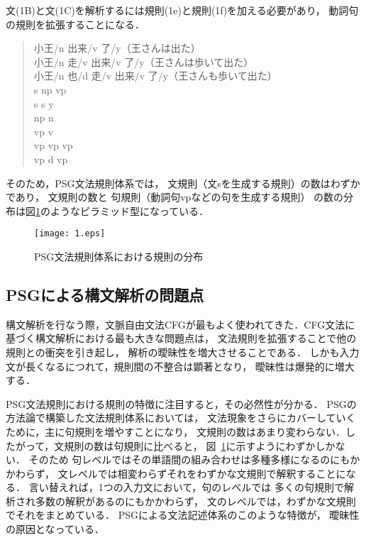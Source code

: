 \documentclass[japanese]{jnlp_1.3a}
\begin{document}
文(1B)と文(1C)を解析するには規則(1e)と規則(1f)を加える必要があり，
動詞句の規則を拡張することになる．
\def\ya{}
\def\文(#1){}
\def\規則(#1){}
\def\インデント{}
\begin{quotation}\noindent
\文(1A) 小王/n 出来/v 了/y（王さんは出た）\\
\文(1B) 小王/n 走/v 出来/v 了/y（王さんは歩いて出た）\\
\文(1C) 小王/n 也/d 走/v 出来/v 了/y（王さんも歩いて出た）\\
\規則(1a) s \ya np vp\\
\規則(1b) s \ya s y\\
\規則(1c) np \ya n\\
\規則(1d) vp \ya v\\
\規則(1e) vp \ya vp vp\\
\規則(1f) vp \ya d vp\\
\end{quotation}

そのため，PSG文法規則体系では，
文規則（文sを生成する規則）の数はわずかであり，
文規則の数と
句規則（動詞句vpなどの句を生成する規則）
の数の分布は図\ref{fig:psgpyra}のようなピラミッド型になっている．

\begin{figure}[t]
  \begin{center}
       \texttt{[image: 1.eps]}
   \caption{PSG文法規則体系における規則の分布}
   \label{fig:psgpyra}
  \end{center}
\end{figure}


\subsection{PSGによる構文解析の問題点}
構文解析を行なう際，文脈自由文法CFGが最もよく使われてきた．CFG文法に
基づく構文解析における最も大きな問題点は，
文法規則を拡張することで他の規則との衝突を引き起し，
解析の曖昧性を増大させることである．
しかも入力文が長くなるにつれて，規則間の不整合は顕著となり，
曖昧性は爆発的に増大する．

PSG文法規則における規則の特徴に注目すると，その必然性が分かる．
PSGの方法論で構築した文法規則体系においては，
文法現象をさらにカバーしていくために，主に句規則を増やすことになり，
文規則の数はあまり変わらない．したがって，文規則の数は句規則に比べると，
図~\ref{fig:psgpyra}に示すようにわずかしかない．
そのため
句レベルではその単語間の組み合わせは多種多様になるのにもかかわらず，
文レベルでは相変わらずそれをわずかな文規則で解釈することになる．
言い替えれば，1つの入力文において，句のレベルでは
多くの句規則で解析され多数の解釈があるのにもかかわらず，
文のレベルでは，わずかな文規則でそれをまとめている．
PSGによる文法記述体系のこのような特徴が，
曖昧性の原因となっている．
\end{document}
